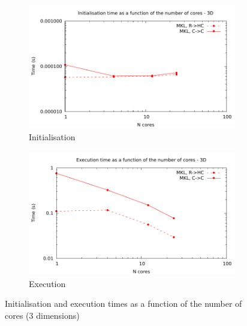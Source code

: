 \documentclass[12pt, a4paper]{article} \setlength{\textheight}{24cm}
\begin{document}
\begin{figure}[H]
  \captionsetup{width=0.8\linewidth}
  \centering
  \begin{subfigure}{.5\textwidth}
    \centering
    \includegraphics[width=.9\linewidth]{graphs/mpi-multh-init-3d.pdf}
    \caption{Initialisation}
    \label{3DMPIMULTHI}
  \end{subfigure}%
  \begin{subfigure}{.5\textwidth}
    \centering
    \includegraphics[width=.9\linewidth]{graphs/mpi-multh-exec-3d.pdf}
    \caption{Execution}
    \label{3DMPIMULTHE}
  \end{subfigure}
  \caption{Initialisation and execution times as a function of the
    number of cores (3 dimensions)}
  \label{3DMPIMULTH}
\end{figure}
\end{document}
